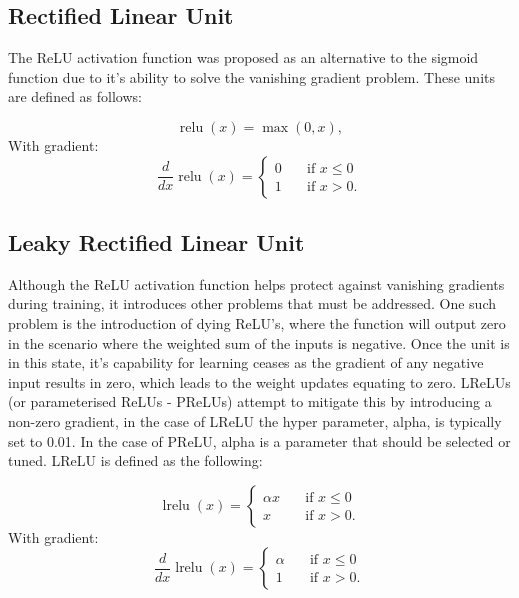 \documentclass{article}
\DeclareMathOperator{\relu}{relu}
\DeclareMathOperator{\lrelu}{lrelu}
\begin{document}
\subsection{Rectified Linear Unit}

The ReLU activation function was proposed as an alternative to the sigmoid function due to it's ability to solve the vanishing gradient problem\citep{nair2010rectified}. These units are defined as follows:

\begin{equation}
  \relu(x) = \max(0, x) ,
\end{equation}
With gradient:
\begin{equation}
  \frac{d}{dx} \relu(x) =
     \begin{cases} 
      0      & \quad \text{if } x \leq  0 \\
      1       & \quad \text{if } x > 0 .
    \end{cases} 
\end{equation}

\subsection{Leaky Rectified Linear Unit}

Although the ReLU activation function helps protect against vanishing gradients during training, it introduces other problems that must be addressed. One such problem is the introduction of dying ReLU’s, where the function will output zero in the scenario where the weighted sum of the inputs is negative. Once the unit is in this state, it’s capability for learning ceases as the gradient of any negative input results in zero, which leads to the weight updates equating to zero. LReLUs (or parameterised ReLUs - PReLUs)\citep{he2015delving} attempt to mitigate this by introducing a non-zero gradient, in the case of LReLU the hyper parameter, alpha, is typically set to 0.01. In the case of PReLU, alpha is a parameter that should be selected or tuned. LReLU is defined as the following:

\begin{equation}
  \lrelu(x) = 
    \begin{cases}
      \alpha x      & \quad \text{if } x \leq  0 \\
      x       & \quad \text{if } x > 0 .
    \end{cases}
\end{equation} 
With gradient:
\begin{equation}
  \frac{d}{dx} \lrelu(x) =
     \begin{cases}
      \alpha      & \quad \text{if } x \leq  0 \\
      1       & \quad \text{if } x > 0 .
    \end{cases} 
\end{equation}
\end{document}
